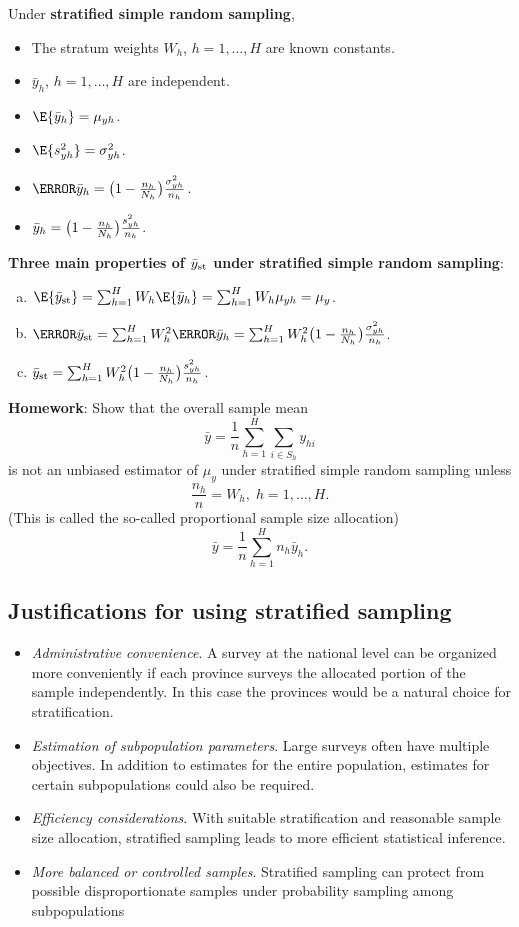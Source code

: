 Under \textbf{stratified simple random sampling},
\begin{itemize}
      \item The stratum weights $ W_h $, $ h=1,\ldots,H $ are known constants.
      \item $ \bar{y}_h $, $ h=1,\ldots,H $ are independent.
      \item $ \E{\bar{y}_h}=\mu_{yh} $.
      \item $ \E{s_{yh}^2}=\sigma_{yh}^2 $.
      \item $ \V{\bar{y}_h}=\bigl(1-\frac{n_h}{N_h}\bigr)\frac{\sigma_{yh}^2}{n_h} $.
      \item $ \relax{\bar{y}_h}=\bigl(1-\frac{n_h}{N_h}\bigr)\frac{s_{yh}^2}{n_h} $.
\end{itemize}
\textbf{Three main properties of $ \bar{y}_{\text{st}} $ under stratified simple random
      sampling}:
\begin{enumerate}[(a)]
      \item $ \E{\bar{y}_{\st}}=\sum_{h=1}^{H}W_h\E{\bar{y}_h}=\sum_{h=1}^{H}W_h \mu_{yh}=\mu_y $.
      \item $ \V{\bar{y}_{\st}}=\sum_{h=1}^{H}W_h^2\V{\bar{y}_h}=\sum_{h=1}^{H}W_h^2\bigl(1-\frac{n_h}{N_h}\bigr)\frac{\sigma_{yh}^2}{n_h} $.
      \item $ \relax{\bar{y}_{\text{st}}}=\sum_{h=1}^{H}W_h^2\bigl(1-\frac{n_h}{N_h}\bigr)\frac{s_{yh}^2}{n_h} $.
\end{enumerate}
\textbf{Homework}: Show that the overall sample mean
\[ \bar{y}=\frac{1}{n}\sum_{h=1}^{H}\sum_{i\in S_h}y_{hi} \]
is not an unbiased estimator of $ \mu_y $ under stratified simple random sampling
unless
\[ \frac{n_h}{n}=W_h,\; h=1,\ldots,H. \]
(This is called the so-called proportional sample size allocation)
\[ \bar{y}=\frac{1}{n}\sum_{h=1}^{H}n_h\bar{y}_h. \]
\subsection{Justifications for using stratified sampling}
\begin{itemize}
      \item \emph{Administrative convenience}. A survey at the national level can
            be organized more conveniently if each province surveys the
            allocated portion of the sample independently. In this case the
            provinces would be a natural choice for stratification.
      \item \emph{Estimation of subpopulation parameters}. Large surveys often
            have multiple objectives. In addition to estimates for the entire
            population, estimates for certain subpopulations could also be
            required.
      \item \emph{Efficiency considerations}. With suitable stratification and
            reasonable sample size allocation, stratified sampling leads to
            more efficient statistical inference.
      \item \emph{More balanced or controlled samples}. Stratified sampling can
            protect from possible disproportionate samples under probability
            sampling among subpopulations
\end{itemize}
